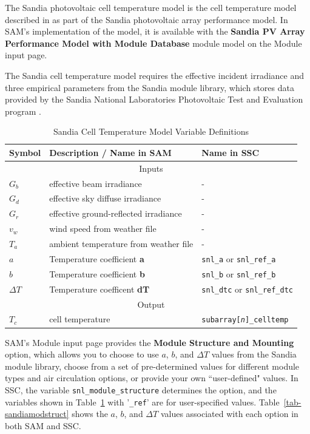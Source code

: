 \documentclass[12pt,letterpaper]{article}
\begin{document}
The Sandia photovoltaic cell temperature model is the cell temperature model described in \citet{king2004} as part of the Sandia photovoltaic array performance model. In SAM's implementation of the model, it is available with the \textbf{Sandia PV Array Performance Model with Module Database} module model on the Module input page.

The Sandia cell temperature model requires the effective incident irradiance and three empirical parameters from the Sandia module library, which stores data provided by the Sandia National Laboratories Photovoltaic Test and Evaluation program \citep{sandia-testeval}.

\begin{table}
\begin{center}
\caption{Sandia Cell Temperature Model Variable Definitions}
\begin{tabular}{lll}
\midrule
Symbol & Description / \textbf{Name in SAM} & Name in SSC \\
\midrule
\multicolumn{3}{c}{Inputs}\\
$G_b$ & effective beam irradiance & - \\
$G_d$ & effective sky diffuse irradiance & - \\
$G_r$ & effective ground-reflected irradiance & - \\
$v_{w}$ & wind speed from weather file & - \\
$T_{a}$ & ambient temperature from weather file & - \\
$a$ & Temperature coefficient \textbf{a} & \texttt{snl\_a} or \texttt{snl\_ref\_a}\\
$b$ &  Temperature coefficient \textbf{b} & \texttt{snl\_b} or \texttt{snl\_ref\_b}\\
$\Delta T$ & Temperature coefficent \textbf{dT} & \texttt{snl\_dtc} or \texttt{snl\_ref\_dtc} \\
\midrule
\multicolumn{3}{c}{Output}\\
$T_c$ & cell temperature & \texttt{subarray[\textit{n}]\_celltemp} \\
\hline
\end{tabular}
\label{tab-tempsandia}
\end{center}
\end{table}

SAM's Module input page provides the \textbf{Module Structure and Mounting} option, which allows you to choose to use $a$, $b$, and $\Delta T$ values from the Sandia module library, choose from a set of pre-determined values for different module types and air circulation options, or provide your own ``user-defined" values. In SSC, the variable \texttt{snl\_module\_structure} determines the option, and the variables shown in Table~\ref{tab-tempsandia} with '\texttt{\_ref}' are for user-specified values. Table~\ref{tab-sandiamodstruct} shows the $a$, $b$, and $\Delta T$ values associated with each option in both SAM and SSC.
\end{document}
